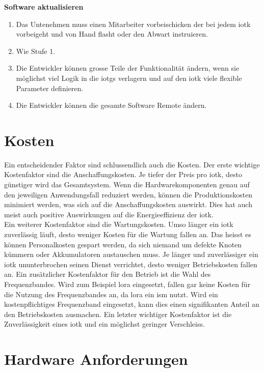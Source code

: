 \textbf{Software aktualisieren}
\begin{enumerate}  
  \item Das Untenehmen muss einen Mitarbeiter vorbeischicken der bei jedem \gls{iotk} vorbeigeht und von Hand flasht oder den Abwart instruieren.
  \item Wie Stufe 1.
  \item Die Entwickler können grosse Teile der Funktionalität ändern, wenn sie möglichst viel Logik in die \glspl{iotg} verlagern und auf den \gls{iotk} viele flexible Parameter definieren.
  \item Die Entwickler können die gesamte Software Remote ändern.
\end{enumerate}

\section{Kosten}

Ein entscheidender Faktor sind schlussendlich auch die Kosten. Der erste wichtige Kostenfaktor sind die Anschaffungskosten. Je tiefer der Preis pro \gls{iotk}, desto günstiger wird das Gesamtsystem. Wenn die Hardwarekomponenten genau auf den jeweiligen Anwendungsfall reduziert werden, können die Produktionskosten minimiert werden, was sich auf die Anschaffungskosten auswirkt. Dies hat auch meist auch positive Auswirkungen auf die Energieeffizienz der \gls{iotk}.\\
Ein weiterer Kostenfaktor sind die Wartungskosten. Umso länger ein \gls{iotk} zuverlässig läuft, desto weniger Kosten für die Wartung fallen an. Das heisst es können Personalkosten gespart werden, da sich niemand um defekte Knoten kümmern oder Akkumulatoren austauschen muss. Je länger und zuverlässiger ein \gls{iotk} ununterbrochen seinen Dienst verrichtet, desto weniger Betriebskosten fallen an. Ein zusätzlicher Kostenfaktor für den Betrieb ist die Wahl des Frequenzbandes. Wird zum Beispiel \gls{lora} eingesetzt, fallen gar keine Kosten für die Nutzung des Frequenzbandes an, da \gls{lora} ein \gls{ism} nutzt. Wird ein kostenpflichtiges Frequenzband eingesetzt, kann dies einen signifikanten Anteil an den Betriebskosten ausmachen. Ein letzter wichtiger Kostenfaktor ist die Zuverlässigkeit eines \gls{iotk} und ein möglichst geringer Verschleiss.

\section{Hardware Anforderungen}

